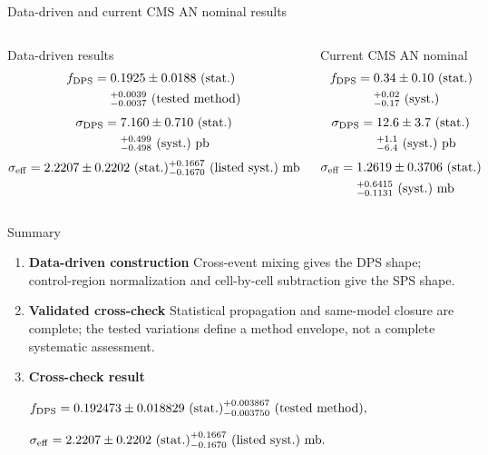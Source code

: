 \documentclass[11pt,aspectratio=169]{beamer}
\begin{document}
\begin{frame}{Data-driven and current CMS AN nominal results}
\scriptsize
\begin{columns}[T]
\begin{exampleblock}{Data-driven results}
\[\begin{aligned}f_{\rm DPS}={}&0.1925\pm0.0188\ {\rm(stat.)}\\&{}^{+0.0039}_{-0.0037}\ {\rm(tested\ method)}\end{aligned}\]
\[\begin{aligned}\sigma_{\rm DPS}={}&7.160\pm0.710\ {\rm(stat.)}\\&{}^{+0.499}_{-0.498}\ {\rm(syst.)}\ {\rm pb}\end{aligned}\]
\[\sigma_{\rm eff}=2.2207\pm0.2202\ {\rm(stat.)}{}^{+0.1667}_{-0.1670}\ {\rm(listed\ syst.)}\ {\rm mb}\]
\end{exampleblock}
\begin{block}{Current CMS AN nominal}
\[\begin{aligned}f_{\rm DPS}={}&0.34\pm0.10\ {\rm(stat.)}\\&{}^{+0.02}_{-0.17}\ {\rm(syst.)}\end{aligned}\]
\[\begin{aligned}\sigma_{\rm DPS}={}&12.6\pm3.7\ {\rm(stat.)}\\&{}^{+1.1}_{-6.4}\ {\rm(syst.)}\ {\rm pb}\end{aligned}\]
\[\begin{aligned}\sigma_{\rm eff}={}&1.2619\pm0.3706\ {\rm(stat.)}\\&{}^{+0.6415}_{-0.1131}\ {\rm(syst.)}\ {\rm mb}\end{aligned}\]
\end{block}
\end{columns}
\end{frame}




\begin{frame}{Summary}
\begin{enumerate}\item \textbf{Data-driven construction} Cross-event mixing gives the DPS shape; control-region normalization and cell-by-cell subtraction give the SPS shape.
\item \textbf{Validated cross-check} Statistical propagation and same-model closure are complete; the tested variations define a method envelope, not a complete systematic assessment.
\item \textbf{Cross-check result}\par\smallskip\centering $f_{\rm DPS}=0.192473\pm0.018829\ {\rm(stat.)}^{+0.003867}_{-0.003750}\ {\rm(tested\ method)},$\par\smallskip $\sigma_{\rm eff}=2.2207\pm0.2202\ {\rm(stat.)}^{+0.1667}_{-0.1670}\ {\rm(listed\ syst.)}\ {\rm mb}.$\end{enumerate}
\vfill\centering{}
\end{frame}
\end{document}

